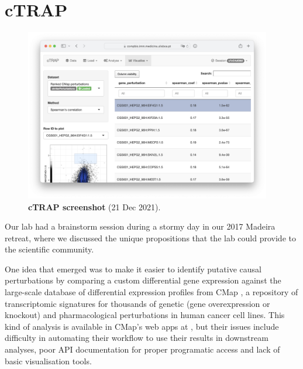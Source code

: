
\chapter{cTRAP}
\label{chap:ctrap}

\begin{figure}[!b]
  \vspace*{-1cm}
  \includegraphics[width=0.96\textwidth]{images/cTRAP/screenshot}
  \centering
  \vspace*{-.5cm}
  \caption[cTRAP screenshot]{\textbf{cTRAP screenshot} (21 Dec 2021).}
  \label{fig:cTRAP-screenshot}
\end{figure}

Our lab had a brainstorm session during a stormy day in our 2017 Madeira retreat, where we discussed the unique propositions that the lab could provide to the scientific community.

One idea that emerged was to make it easier to identify putative causal perturbations by comparing a custom differential gene expression against the large-scale database of differential expression profiles from CMap \cite{subramanian:2017ul}, a repository of transcriptomic signatures for thousands of genetic (gene overexpression or knockout) and pharmacological perturbations in human cancer cell lines. This kind of analysis is available in CMap's web apps at  \cite{subramanian:2017ul}, but their issues include difficulty in automating their workflow to use their results in downstream analyses, poor API documentation for proper programatic access and lack of basic visualisation tools.

